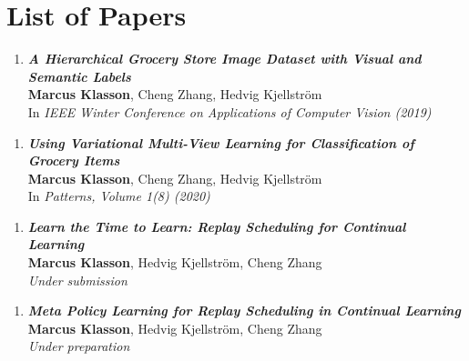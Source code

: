 
\chapter{List of Papers}
\label{chap:list_of_papers}

\begin{enumerate}[\textbf{A}]
	\item \textbf{\textit{A Hierarchical Grocery Store Image Dataset with Visual and Semantic Labels}} \\
	\textbf{Marcus Klasson}, Cheng Zhang, Hedvig Kjellström \\
	In \textit{IEEE Winter Conference on Applications of Computer Vision (2019)}
\end{enumerate}

\begin{enumerate}[\textbf{B}]
	\item \textbf{\textit{Using Variational Multi-View Learning for Classification of Grocery Items}} \\
	\textbf{Marcus Klasson}, Cheng Zhang, Hedvig Kjellström \\
	In \textit{Patterns, Volume 1(8) (2020)}
\end{enumerate}

\begin{enumerate}[\textbf{C}]
	\item \textbf{\textit{Learn the Time to Learn: Replay Scheduling for Continual Learning}} \\
	\textbf{Marcus Klasson}, Hedvig Kjellström, Cheng Zhang \\
	\textit{Under submission}
\end{enumerate}

\begin{enumerate}[\textbf{D}]
	\item \textbf{\textit{Meta Policy Learning for Replay Scheduling in Continual Learning}} \\
	\textbf{Marcus Klasson}, Hedvig Kjellström, Cheng Zhang \\
	\textit{Under preparation}
\end{enumerate}



\begin{comment}
Other contributions by the author not included in the thesis.
\begin{enumerate}[I]
	\setcounter{enumi}{1}
	\item \textbf{\textit{Title of paper}} \\
	\textbf{First author}, Second author \\
	\textit{Journal (year)}
\end{enumerate}
\end{comment}
